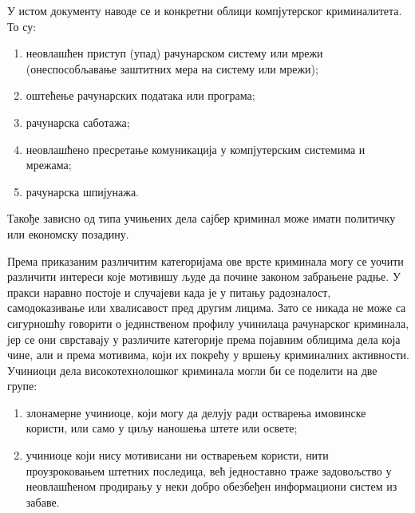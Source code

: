 \documentclass[a4paper]{article}
\begin{document}
	У истом документу наводе се и конкретни облици компјутерског криминалитета. То су:
	\begin{enumerate}
		\item неовлашћен приступ (упад) рачунарском систему или мрежи (онеспособљавање заштитних мера на систему или мрежи);
		\item оштећење рачунарских података или програма;
		\item рачунарска саботажа;
		\item неовлашћено пресретање комуникација у компјутерским системима и мрежама;
		\item рачунарска шпијунажа.
	\end{enumerate}
	Такође зависно од типа учињених дела сајбер криминал може имати политичку или економску позадину. \newline
	
	Према приказаним различитим категоријама ове врсте криминала могу се уочити различити интереси које мотивишу људе да почине законом забрањене радње. У пракси наравно постоје и случајеви када је у питању радозналост, самодоказивање или хвалисавост пред другим лицима. Зато се никада не може са сигурношћу говорити о јединственом профилу учинилаца рачунарског криминала, јер се они сврставају у различите категорије према појавним облицима дела која чине, али и према мотивима, који их покрећу у вршењу криминалних активности. \newline
	Учиниоци дела високотехнолошког криминала могли би се поделити на две групе:
	\begin{enumerate}
		\item злонамерне учиниоце, који могу да делују ради остварења имовинске користи, или само у циљу наношења штете или освете;
		\item учиниоце који нису мотивисани ни остварењем користи, нити проузроковањем штетних последица, већ једноставно траже задовољство у неовлашћеном продирању у неки добро обезбеђен информациони систем из забаве.
	\end{enumerate}
\end{document}
